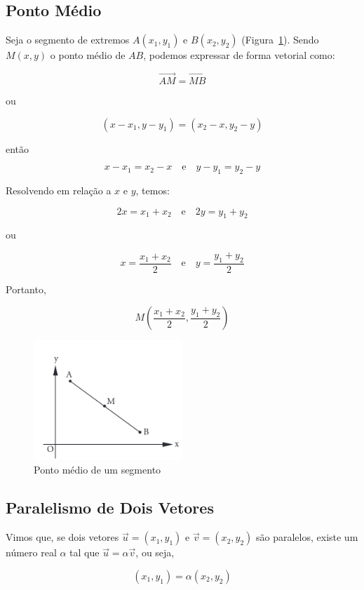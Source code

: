 \newpage
\subsection{Ponto Médio}

Seja o segmento de extremos $A(x_1, y_1)$ e $B(x_2, y_2)$
(Figura~\ref{fig:fig1.50}). Sendo $M(x, y)$ o ponto médio de $AB$, podemos
expressar de forma vetorial como:

\[
  \overrightarrow{AM} = \overrightarrow{MB}
\]

ou

\[
  (x - x_1, y - y_1) = (x_2 - x, y_2 - y)
\]

então

\[
  x - x_1 = x_2 - x \quad \text{e} \quad y - y_1 = y_2 - y
\]

Resolvendo em relação a $x$ e $y$, temos:

\[
  2x = x_1 + x_2 \quad \text{e} \quad 2y = y_1 + y_2
\]

ou

\[
  x = \frac{x_1 + x_2}{2} \quad \text{e} \quad y = \frac{y_1 + y_2}{2}
\]

Portanto,

\[
  M\left(\frac{x_1 + x_2}{2}, \frac{y_1 + y_2}{2}\right)
\]

\begin{figure}[H]
  \centering
  \includegraphics[width=0.5\textwidth]{./fig/fig1.50.png}
  \caption{Ponto médio de um segmento}\label{fig:fig1.50}
\end{figure}

\newpage
\subsection{Paralelismo de Dois Vetores}

Vimos que, se dois vetores $\vec{u} = (x_1, y_1)$ e $\vec{v} = (x_2, y_2)$ são
paralelos, existe um número real $\alpha$ tal que $\vec{u} = \alpha\vec{v}$, ou
seja,

\[
  (x_1, y_1) = \alpha(x_2, y_2)
\]

